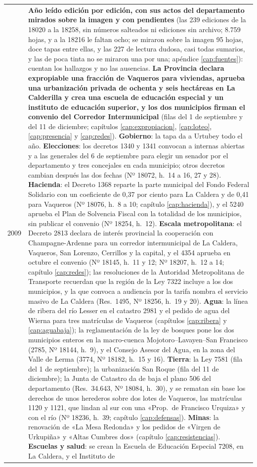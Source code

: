 \begin{longtable}{@{}p{2.7cm}p{10.3cm}@{}}
2009 & \textbf{Año leído edición por edición, con sus actos del departamento mirados sobre la imagen y con pendientes} (las 239 ediciones de la 18020 a la 18258, sin números salteados ni ediciones sin archivo; 8.759 hojas, y a la 18216 le faltan ocho; se miraron sobre la imagen 95 hojas, doce tapas entre ellas, y las 227 de lectura dudosa, casi todas sumarios, y las de poca tinta no se miraron una por una; apéndice \ref{cap:fuentes}): cuentan los hallazgos y no las ausencias. \textbf{La Provincia declara expropiable una fracción de Vaqueros para viviendas, aprueba una urbanización privada de ochenta y seis hectáreas en La Calderilla y crea una escuela de educación especial y un instituto de educación superior, y los dos municipios firman el convenio del Corredor Intermunicipal} (filas del 1 de septiembre y del 11 de diciembre; capítulos \ref{cap:expropiacion}, \ref{cap:loteo}, \ref{cap:presencia} y \ref{cap:redes}). \textbf{Gobierno}: la tapa da a Urtubey todo el año. \textbf{Elecciones}: los decretos 1340 y 1341 convocan a internas abiertas y a las generales del 6 de septiembre para elegir un senador por el departamento y tres concejales en cada municipio; otros decretos cambian después las dos fechas (Nº 18072, h.\ 14 a 16, 27 y 28). \textbf{Hacienda}: el Decreto 1368 reparte la parte municipal del Fondo Federal Solidario con un coeficiente de 0,37 por ciento para La Caldera y de 0,41 para Vaqueros (Nº 18076, h.\ 8 a 10; capítulo \ref{cap:hacienda}), y el 5240 aprueba el Plan de Solvencia Fiscal con la totalidad de los municipios, sin publicar el convenio (Nº 18254, h.\ 12). \textbf{Escala metropolitana}: el Decreto 2813 declara de interés provincial la cooperación con Champagne-Ardenne para un corredor intermunicipal de La Caldera, Vaqueros, San Lorenzo, Cerrillos y la capital, y el 4354 aprueba en octubre el convenio (Nº 18145, h.\ 11 y 12; Nº 18207, h.\ 12 a 14; capítulo \ref{cap:redes}); las resoluciones de la Autoridad Metropolitana de Transporte recuerdan que la región de la Ley 7322 incluye a los dos municipios, y la que convoca a audiencia por la tarifa nombra el servicio masivo de La Caldera (Res.\ 1495, Nº 18256, h.\ 19 y 20). \textbf{Agua}: la línea de ribera del río Lesser en el catastro 2981 y el pedido de agua del Wierna para tres matrículas de Vaqueros (capítulos \ref{cap:ribera} y \ref{cap:aguabaja}); la reglamentación de la ley de bosques pone los dos municipios enteros en la macro-cuenca Mojotoro--Lavayen--San Francisco (2785, Nº 18144, h.\ 9), y el Consejo Asesor del Agua, en la zona del Valle de Lerma (3774, Nº 18182, h.\ 15 y 16). \textbf{Tierra}: la Ley 7581 (fila del 1 de septiembre); la urbanización San Roque (fila del 11 de diciembre); la Junta de Catastro da de baja el plano 506 del departamento (Res.\ 34.643, Nº 18084, h.\ 30), y se rematan sin base los derechos de unos herederos sobre dos lotes de Vaqueros, las matrículas 1120 y 1121, que lindan al sur con una «Prop.\ de Francisco Urquiza» y con el río (Nº 18236, h.\ 39; capítulo \ref{cap:defensas}). \textbf{Minas}: la renovación de «La Mesa Redonda» y los pedidos de «Virgen de Urkupiña» y «Altas Cumbres dos» (capítulo \ref{cap:resistencias}). \textbf{Escuelas y salud}: se crean la Escuela de Educación Especial 7208, en La Caldera, y el Instituto de 
\end{longtable}
